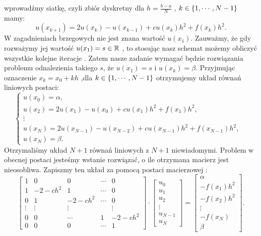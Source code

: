 \documentclass[12pt,a4paper]{report}
\begin{document}
wprowadźmy siatkę, czyli zbiór dyskretny dla $ h= \frac{b-a}{N}$ , $k \in \left\lbrace {1,\cdots,N-1} \right\rbrace$  mamy: 
\begin{equation} \label{boundary_model}
u(x_{k+1}) = 2u(x_k) - u(x_{k-1}) + cu(x_k)h^2 + f(x_k)h^2.
\end{equation}
W zagadnieniach brzegowych nie jest znana wartość $u(x_1)$. Zauważmy, że gdy rozważymy jej wartość $u(x_1) = s \in \mathbb{R}$ , to stosując nasz schemat możemy obliczyć wszystkie kolejne iteracje . Zatem nasze zadanie wymagać będzie rozwiązania problemu odnalezienia takiego $s$, że $u(x_1) = s$ i $u(x_k) = \beta$. Przyjmując oznaczenie $ x_k = x_0 + kh$ ,dla $ k \in \left\lbrace {1, \cdots,N-1} \right\rbrace $ otrzymujemy układ równań liniowych postaci:
\begin{equation}
\left\{ \begin{array}{ll}
u(x_0) = \alpha ,& \\
u(x_2) = 2u(x_1) - u(x_{0}) + cu(x_1)h^2 + f(x_1)h^2 ,& \\ 
\vdots  & \\
u(x_{N}) = 2u(x_{N-1}) - u(x_{N-2}) + cu(x_{N-1})h^2 + f(x_{N-1})h^2 , & \\
u(x_N) = \beta. &
\end{array} \right.
\end{equation}
Otrzymaliśmy układ $N+1$ równań liniowych z $N+1$ niewiadomymi. Problem w obecnej postaci jesteśmy wstanie rozwiązać, o ile otrzymana macierz jest nieosobliwa. Zapiszmy ten układ za pomocą postaci macierzowej :
$$ 
\left[ \begin{array}{ccccc}
1 & 0 & 0 & \cdots &0 \\
1 & -2-ch^2 & 1 &\cdots &0 \\
0 & 1 & -2-ch^2 &\cdots &0 \\
\vdots & \vdots & \vdots &  &\vdots \\
0& 0 & \cdots& 1 & -2-ch^2 \\
0 & 0 & 0&\cdots & 1 
\end{array} \right] \cdot
\left[ \begin{array}{c}
u_0 \\
u_1 \\
u_2 \\
\vdots \\
u_{N-1} \\
u_{N}  
\end{array} \right] =
\left[ \begin{array}{c}
\alpha \\
-f(x_1)h^2 \\
-f(x_2)h^2\\
\vdots \\
-f(x_{N}) \\
\beta   
\end{array} \right] .
$$
\end{document}
